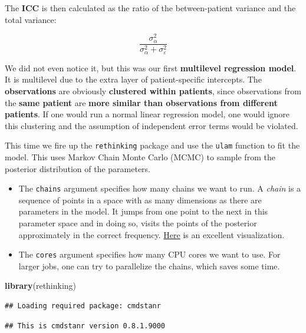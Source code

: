 \documentclass[
]{book}
\newenvironment{Shaded}{\begin{snugshade}}{\end{snugshade}}
\newcommand{\FunctionTok}[1]{\textcolor[rgb]{0.13,0.29,0.53}{\textbf{#1}}}
\newcommand{\NormalTok}[1]{#1}
\begin{document}
The \textbf{ICC} is then calculated as the ratio of the between-patient variance and
the total variance:

\[\frac{\sigma_{\alpha}^2}{\sigma_{\alpha}^2 + \sigma_{\varepsilon}^2}\]

We did not even notice it, but this was our first \textbf{multilevel regression model}.
It is multilevel due to the extra layer of patient-specific intercepts.
The \textbf{observations} are obviously \textbf{clustered within patients}, since observations
from the \textbf{same patient} are \textbf{more similar than observations from different patients}.
If one would run a normal linear regression model, one would ignore this clustering
and the assumption of independent error terms would be violated.

This time we fire up the \texttt{rethinking} package and use the \texttt{ulam} function
to fit the model.
This uses Markov Chain Monte Carlo (MCMC) to sample from the posterior
distribution of the parameters.

\begin{itemize}
\item
  The \texttt{chains} argument specifies how many chains we want to run.
  A \emph{chain} is a sequence of points in a space with as many dimensions as there
  are parameters in the model. It jumps from one point to the next in this parameter
  space and in doing so, visits the points of the posterior approximately in the correct
  frequency. \href{https://blog.revolutionanalytics.com/2013/09/an-animated-peek-into-the-workings-of-bayesian-statistics.html}{Here}
  is an excellent visualization.
\item
  The \texttt{cores} argument specifies how many CPU cores we want to use.
  For larger jobs, one can try to parallelize
  the chains, which saves some time.
\end{itemize}

\begin{Shaded}
\begin{Highlighting}[]
\FunctionTok{library}\NormalTok{(rethinking)}
\end{Highlighting}
\end{Shaded}

\begin{verbatim}
## Loading required package: cmdstanr
\end{verbatim}

\begin{verbatim}
## This is cmdstanr version 0.8.1.9000
\end{verbatim}
\end{document}

